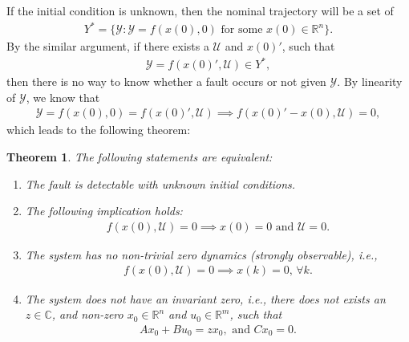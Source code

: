 \documentclass{article}
\newtheorem{theorem}{Theorem}
\newcommand{\y}{{\mathcal Y}}
\renewcommand{\u}{{\mathcal U}}
\begin{document}
If the initial condition is unknown, then the nominal trajectory will be a set of
\begin{align*}
  Y^* = \{\y:\y=f(x(0),0)\text{ for some }x(0)\in \mathbb R^n\}. 
\end{align*}
By the similar argument, if there exists a $\u$ and $x(0)'$, such that 
\begin{align*}
 \y = f(x(0)',\u) \in Y^*,
\end{align*}
then there is no way to know whether a fault occurs or not given $\y$. By linearity of $\y$, we know that
\begin{align*}
 \y = f(x(0),0) = f(x(0)',\u) \implies f(x(0)'-x(0),\u) = 0, 
\end{align*}
which leads to the following theorem:
\begin{theorem}
  The following statements are equivalent:
  \begin{enumerate}
    \item The fault is detectable with unknown initial conditions. 
    \item The following implication holds:
      \begin{align*}
	f(x(0),\u)=0\implies x(0)=0\text{ and }\u=0.
      \end{align*}
    \item The system has no non-trivial zero dynamics (strongly observable), i.e.,
      \begin{align*}
	f(x(0),\u) = 0 \implies x(k) = 0,\,\forall k.
      \end{align*}
    \item The system does not have an invariant zero, i.e., there does not exists an $z\in \mathbb C$, and non-zero $x_0\in\mathbb R^n$ and $u_0\in\mathbb R^m$, such that
      \begin{align}
	Ax_0 + B u_0 = zx_0,\text{ and } Cx_0=0.
	\label{eq:invariantzero}
      \end{align}
  \end{enumerate}
\end{theorem}
\end{document}
